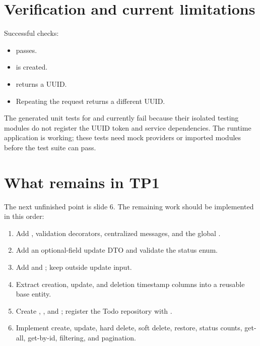 \section{Verification and current limitations}
Successful checks:
\begin{itemize}
\item {} passes.
\item {} is created.
\item {} returns a UUID.
\item Repeating the request returns a different UUID.
\end{itemize}
The generated unit tests for  and  currently fail because their isolated testing modules do not register the UUID token and service dependencies. The runtime application is working; these tests need mock providers or imported modules before the test suite can pass.

\section{What remains in TP1}
The next unfinished point is slide 6. The remaining work should be implemented in this order:
\begin{enumerate}
\item Add , validation decorators, centralized messages, and the global .
\item Add an optional-field update DTO and validate the status enum.
\item Add  and ; keep  outside update input.
\item Extract creation, update, and deletion timestamp columns into a reusable base entity.
\item Create , , and ; register the Todo repository with .
\item Implement create, update, hard delete, soft delete, restore, status counts, get-all, get-by-id, filtering, and pagination.
\end{enumerate}

